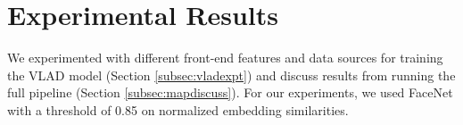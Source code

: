 \documentclass[a4paper]{article}
\begin{document}
%
%


\section{Experimental Results}
\label{sec:experiments}

We experimented with different front-end features and data sources for training the VLAD model (Section \ref{subsec:vladexpt}) and discuss results from running the full pipeline (Section \ref{subsec:mapdiscuss}).
For our experiments, we used FaceNet \cite{Sch15} with a threshold of 0.85 on normalized embedding similarities.
\end{document}
